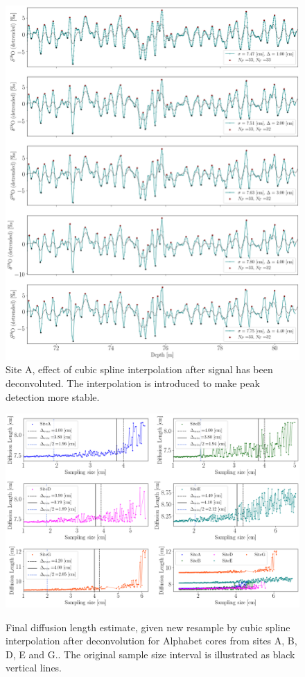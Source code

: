 \documentclass[../../CompleteThesis2/Complete_2ndDraft]{subfiles}
\begin{document}
\begin{figure}[h]
	\centering
	\includegraphics[width=\textwidth]{SiteA_InterpAF_SpecificResampling_BD.png}
	\caption[Back diffused data, Site A, different resamplings after deconvolution.]{\small Site A, effect of cubic spline interpolation after signal has been deconvoluted. The interpolation is introduced to make peak detection more stable.}
	\label{Fig:COMPMETH_SiteA_InterpAF_4samplings}
\end{figure}

\begin{figure}[h]
	\centering
	\includegraphics[width=\textwidth]{AllCores_InterpAF_deltaVSdiffLen_BD.png}
	\caption[Diffusion length versus resampling size after deconvolution, all cores.]{\small Final diffusion length estimate, given new resample by cubic spline interpolation after deconvolution for Alphabet cores from sites A, B, D, E and G.. The original sample size interval is illustrated as black vertical lines.}
	\label{Fig:COMPMETH_AllCores_SamplingVsDiffLen}\textit{}
\end{figure}
\end{document}
